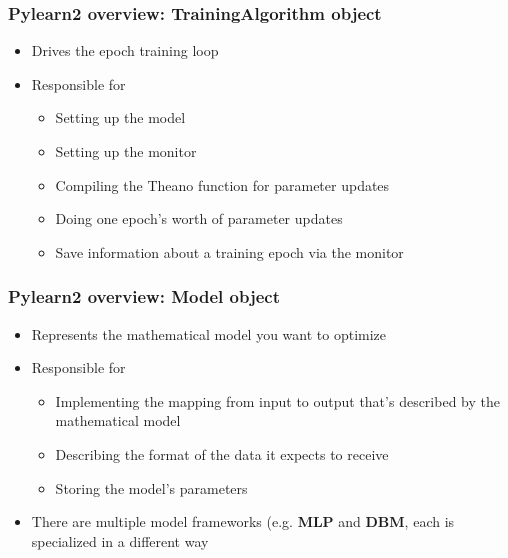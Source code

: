 \documentclass[mathserif, xcolor=dvipsnames]{beamer}
\begin{document}
\begin{frame}
    \frametitle{Pylearn2 overview: \textbf{TrainingAlgorithm} object}
    \begin{itemize}\addtolength{\itemsep}{0.5\baselineskip}
        \item{Drives the epoch training loop}
        \item{
            Responsible for
            \begin{itemize}
                \item{Setting up the model}
                \item{Setting up the monitor}
                \item{Compiling the Theano function for parameter updates}
                \item{Doing one epoch's worth of parameter updates}
                \item{Save information about a training epoch via the monitor}
            \end{itemize}
        }
    \end{itemize}

\end{frame}

\begin{frame}
    \frametitle{Pylearn2 overview: \textbf{Model} object}
    \begin{itemize}\addtolength{\itemsep}{0.5\baselineskip}
        \item{Represents the mathematical model you want to optimize}
        \item{
            Responsible for
            \begin{itemize}
                \item{Implementing the mapping from input to output that's
                      described by the mathematical model}
                \item{Describing the format of the data it expects to receive}
                \item{Storing the model's parameters}
            \end{itemize}
        }
        \item{There are multiple model frameworks (e.g. \textbf{MLP} and
              \textbf{DBM}, each is specialized in a different way}
    \end{itemize}

\end{frame}
\end{document}
